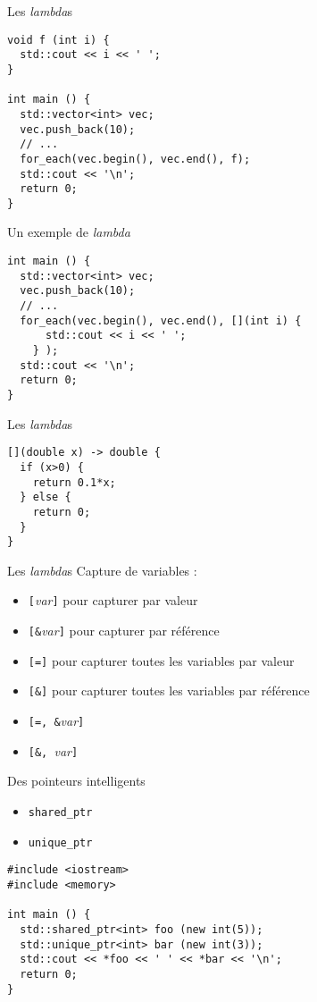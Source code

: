 \begin{frame}[fragile]{Les \textit{lambda}s}
  \begin{lstlisting}
void f (int i) {
  std::cout << i << ' ';
}

int main () {
  std::vector<int> vec;
  vec.push_back(10);
  // ...
  for_each(vec.begin(), vec.end(), f);
  std::cout << '\n';
  return 0;
}
  \end{lstlisting}
\end{frame}

\begin{frame}[fragile]{Un exemple de \textit{lambda}}
  \begin{lstlisting}
int main () {
  std::vector<int> vec;
  vec.push_back(10);
  // ...
  for_each(vec.begin(), vec.end(), [](int i) {
      std::cout << i << ' ';
    } );
  std::cout << '\n';
  return 0;
}
  \end{lstlisting}
\end{frame}

\begin{frame}[fragile]{{Les \textit{lambda}s}}
  \begin{lstlisting}
[](double x) -> double {
  if (x>0) {
    return 0.1*x;
  } else {
    return 0;
  }
}
  \end{lstlisting}
\end{frame}

\begin{frame}{{Les \textit{lambda}s}}
  Capture de variables :
  \begin{itemize}
  \item \texttt{[}\textit{var}\texttt{]} pour capturer par valeur
  \item \texttt{[\&}\textit{var}\texttt{]} pour capturer par référence
  \item \texttt{[=]} pour capturer toutes les variables par valeur
  \item \texttt{[\&]} pour capturer toutes les variables par référence
  \item \texttt{[=, \&}\textit{var}\texttt{]}
  \item \texttt{[\&, }\textit{var}\texttt{]}
  \end{itemize}
\end{frame}

\begin{frame}[fragile]{Des pointeurs intelligents}
  \begin{itemize}
  \item \texttt{shared\_ptr}
  \item \texttt{unique\_ptr}
  \end{itemize}
  \begin{lstlisting}
#include <iostream>
#include <memory>

int main () {
  std::shared_ptr<int> foo (new int(5));
  std::unique_ptr<int> bar (new int(3));
  std::cout << *foo << ' ' << *bar << '\n';
  return 0;
}
  \end{lstlisting}
\end{frame}

